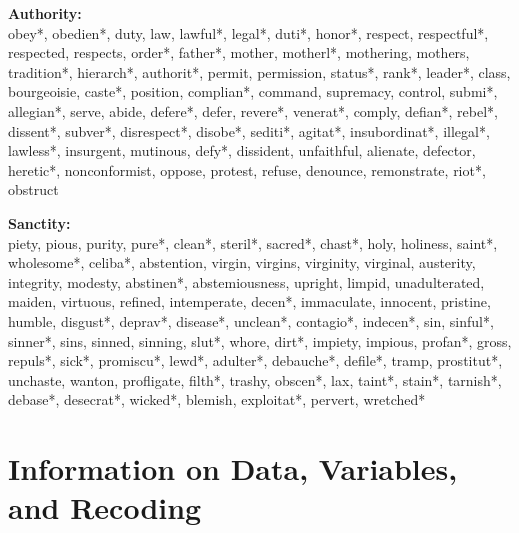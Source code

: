 \begin{flushleft}
\textbf{Authority:}\\
obey*, obedien*, duty, law, lawful*, legal*, duti*, honor*, respect, respectful*, respected, respects, order*, father*, mother, motherl*, mothering, mothers, tradition*, hierarch*, authorit*, permit, permission, status*, rank*, leader*, class, bourgeoisie, caste*, position, complian*, command, supremacy, control, submi*, allegian*, serve, abide, defere*, defer, revere*, venerat*, comply, defian*, rebel*, dissent*, subver*, disrespect*, disobe*, sediti*, agitat*, insubordinat*, illegal*, lawless*, insurgent, mutinous, defy*, dissident, unfaithful, alienate, defector, heretic*, nonconformist, oppose, protest, refuse, denounce, remonstrate, riot*, obstruct
\vspace{.5cm}

\textbf{Sanctity:}\\
piety, pious, purity, pure*, clean*, steril*, sacred*, chast*, holy, holiness, saint*, wholesome*, celiba*, abstention, virgin, virgins, virginity, virginal, austerity, integrity, modesty, abstinen*, abstemiousness, upright, limpid, unadulterated, maiden, virtuous, refined, intemperate, decen*, immaculate, innocent, pristine, humble, disgust*, deprav*, disease*, unclean*, contagio*, indecen*, sin, sinful*, sinner*, sins, sinned, sinning, slut*, whore, dirt*, impiety, impious, profan*, gross, repuls*, sick*, promiscu*, lewd*, adulter*, debauche*, defile*, tramp, prostitut*, unchaste, wanton, profligate, filth*, trashy, obscen*, lax, taint*, stain*, tarnish*, debase*, desecrat*, wicked*, blemish, exploitat*, pervert, wretched*
\vspace{.5cm}


\end{flushleft}

\clearpage

\section{Information on Data, Variables, and Recoding}

